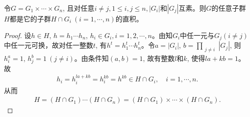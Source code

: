 \documentclass[../../main.tex]{subfiles}%
\begin{document}
\begin{example}
令$G = G_1 \times \cdots \times G_n$, 且对任意$i \neq j, 1 \leqslant i,j \leqslant n, |G_i|$和$|G_j|$互素。则$G$的任意子群$H$都是它的子群$H \cap G_i\ (i = 1, \cdots, n)$的直积。
\end{example}
\begin{proof}
设$h \in H$, $h = h_1 \cdots h_n$, $h_i \in G_i, i = 1,2,\cdots,n$。由知$G_i$中任一元与$G_j(i \neq j)$中任一元可换，故对任一整数$t$, 有$h^t = h_1^t \cdots h_n^t$。令$a = |G_i|$, $b = \prod\limits_{\substack{j \neq i}} |G_j|$, 则$h_i^a = 1$, $h_j^b = 1\ (j \neq i)$。由条件知$(a,b) = 1$, 故有整数$l$和$k$, 使得$la+kb = 1$。故
\begin{align*}
h_i = h_i^{la+kb} = h_i^{kb} = h^{kb} \in H \cap G_i, \quad i = 1, \cdots, n.
\end{align*}
从而
\begin{align*}
H = (H \cap G_1) \cdots (H \cap G_n) = (H \cap G_1) \times \cdots \times (H \cap G_n).
\end{align*}
\end{proof}
\end{document}
